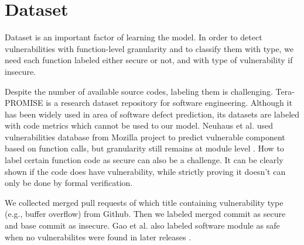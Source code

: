 \section{Dataset}

Dataset is an important factor of learning the model. In order to detect vulnerabilities with function-level granularity and to classify them with type, we need each function labeled either secure or not, and with type of vulnerability if insecure.

Despite the number of available source codes, labeling them is challenging.
Tera-PROMISE \cite{promiserepo} is a research dataset repository for software engineering. Although it has been widely used in area of software defect prediction, its datasets are labeled with code metrics which cannot be used to our model.
Neuhaus et al. used vulnerabilities database from Mozilla project to predict vulnerable component based on function calls, but granularity still remains at module level \cite{neuhaus2007predicting}.
How to label certain function code as secure can also be a challenge. It can be clearly shown if the code does have vulnerability, while strictly proving it doesn't can only be done by formal verification.

We collected merged pull requests of which title containing vulnerability type (e.g., buffer overflow) from Github. Then we labeled merged commit as secure and base commit as insecure. Gao et al. also labeled software module as safe when no vulnerabilites were found in later releases \cite{gao2011choosing}.